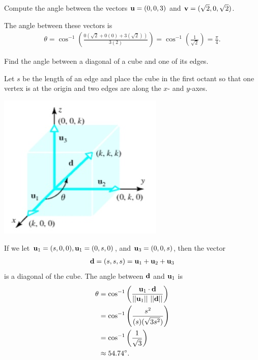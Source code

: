 \documentclass[12pt,letterpaper,reqno]{article}
\numberwithin{equation}{section}
\begin{document}
\begin{exercise}
Compute the angle between the vectors ${\bf u}=(0,0,3)$ and ${\bf v}=(\sqrt{2},0,\sqrt{2})$.	
\end{exercise}

{\color{red}  The angle between these vectors is
\begin{align*}
	\theta=\cos^{-1}\left(\frac{0(\sqrt{2}+0(0)+3(\sqrt{2}))}{3(2)}\right)=\cos^{-1}\left(\frac{1}{\sqrt{2}}\right)=\frac{\pi}{4}.
\end{align*}}

\begin{exercise}
	Find the angle between a diagonal of a cube and one of its edges.
\end{exercise}

{\color{red} 
Let $s$ be the length of an edge and place the cube in the first octant so that one vertex is at the origin and two edges are along the $x$- and $y$-axes.
\begin{center}
	\includegraphics[scale=0.5]{figures_mvc/cube_coordinates}
\end{center}
If we let ${\bf u}_1=(s,0,0), {\bf u}_1=(0,s,0)$, and ${\bf u}_3=(0,0,s)$, then the vector
\begin{align*}
	{\bf d}=(s,s,s)={\bf u}_1+{\bf u}_2+{\bf u}_3
\end{align*}
is a diagonal of the cube. The angle between ${\bf d}$ and ${\bf u}_1$ is 
\begin{align*}
	\theta &=\cos^{-1}\left(\frac{{\bf u}_1 \cdot {\bf d}}{||{\bf u}_1 || \ || {\bf d}||}\right) \\
	&=\cos^{-1}\left(\frac{s^2}{(s)(\sqrt{3s^2})}\right)  \\
	&=\cos^{-1}\left(\frac{1}{\sqrt{3}}\right) \\
	&\approx 54.74^\circ.
\end{align*}
}
\end{document}
